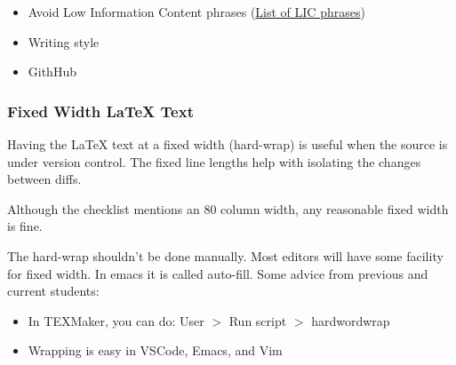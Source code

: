 \documentclass[12pt]{article}
\begin{document}
\begin{itemize}
  \item Avoid Low Information Content phrases
        (\href{https://www.webpages.uidaho.edu/range357/extra-refs/empty-words.htm}{List of LIC phrases})


  \item Writing style

  \item GithHub

\end{itemize}

\subsubsection*{Fixed Width \LaTeX{} Text}

Having the \LaTeX{} text at a fixed width (hard-wrap) is useful when the source is under version
control. The fixed line lengths help with isolating the changes between diffs.

Although the checklist mentions an 80 column width, any reasonable fixed width is fine.

The hard-wrap shouldn't be done manually. Most editors will have some facility for fixed width. In
emacs it is called auto-fill. Some advice from previous and current students:

\begin{itemize}
  \item In TEXMaker, you can do: User $>$ Run script $>$ hardwordwrap
  \item Wrapping is easy in VSCode, Emacs, and Vim
\end{itemize}
\end{document}
